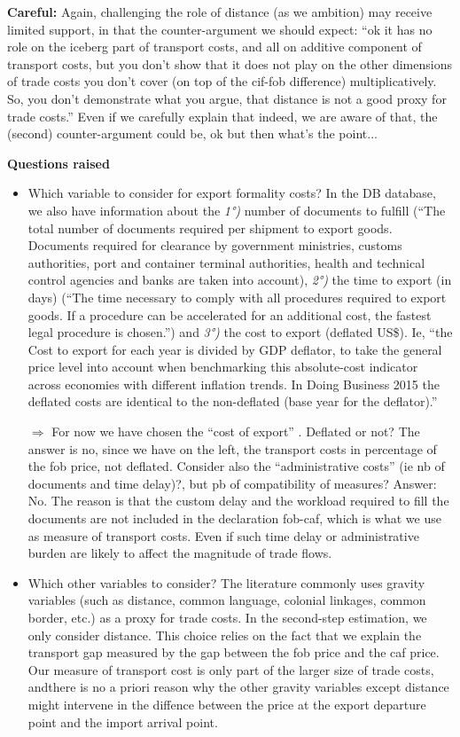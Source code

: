 \documentclass[a4paper,11pt]{article}
\begin{document}
\textbf{Careful:} Again, challenging the role of distance (as we ambition) may receive limited support, in that the counter-argument we should expect: ``ok it has no role on the iceberg part of transport costs, and all on additive component of transport costs, but you don't show that it does not play on the other dimensions of trade costs you don't cover (on top of the cif-fob difference) multiplicatively. So, you don't demonstrate what you argue, that distance is not a good proxy for trade costs.'' Even if we carefully explain that indeed, we are aware of that, the (second) counter-argument could be, ok but then what's the point...


\textbf{Questions raised} \medskip
\begin{itemize}
\item Which variable to consider for export formality costs? In the DB database, we also have information about the \textit{1°)} number of documents to fulfill (``The total number of documents required per shipment to export goods. Documents required for clearance by government ministries, customs authorities, port and container terminal authorities, health and technical control agencies and banks are taken into account), \textit{2°)} the time to export (in days) (``The time necessary to comply with all procedures required to export goods. If a procedure can be accelerated for an additional cost, the fastest legal procedure is chosen.'') and \textit{3°)} the cost to export (deflated US\$). Ie, ``the Cost to export for each year is divided by GDP deflator, to take the general price level into account when benchmarking this absolute-cost indicator across economies with different inflation trends. In Doing Business 2015 the deflated costs are identical to the non-deflated (base year for the deflator).''

\item[$\Rightarrow$] For now we have chosen the ``cost of export'' . Deflated or not? The answer is no, since we have on the left, the transport costs in percentage of the fob price, not deflated. Consider also the ``administrative costs'' (ie nb of documents and time delay)?, but pb of compatibility of measures? Answer: No. The reason is that the custom delay and the workload required to fill the documents are not included in the declaration fob-caf, which is what we use as measure of transport costs. Even if such time delay or administrative burden are likely to affect the magnitude of trade flows.

\item Which other variables to consider? The literature commonly uses gravity variables (such as distance, common language, colonial linkages, common border, etc.) as a proxy for trade costs. In the second-step estimation, we only consider distance. This choice relies on the fact that we explain the transport gap measured by the gap between the fob price and the caf price. Our measure of transport cost is only part of the larger size of trade costs, andthere is no a priori reason why the other gravity variables except distance might intervene in the diffence between the price at the export departure point and the import arrival point.



\end{itemize}
\end{document}
